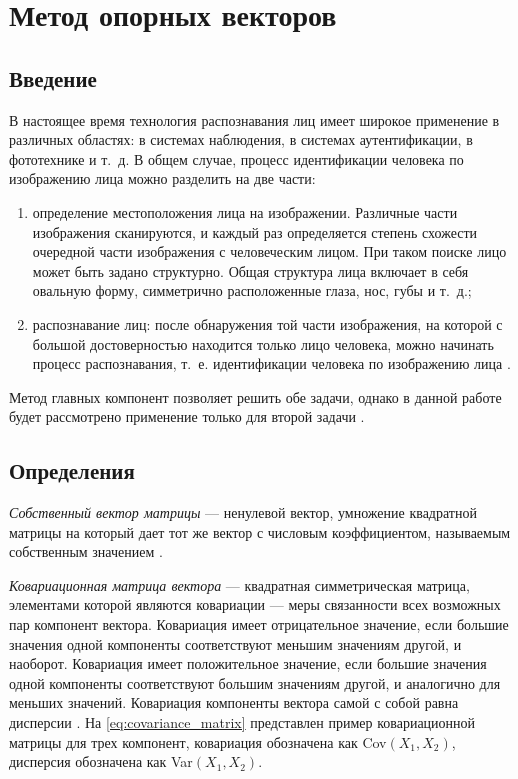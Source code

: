 \chapter{Метод опорных векторов}
\section{Введение}

В настоящее время технология распознавания лиц имеет широкое применение в различных областях: в системах наблюдения, в системах аутентификации, в фототехнике и т.~д. В общем случае, процесс идентификации человека по изображению лица можно разделить на две части:
\begin{enumerate}
	\item определение местоположения лица на изображении. Различные части изображения сканируются, и каждый раз определяется степень схожести очередной части изображения с человеческим лицом.  При таком поиске лицо может быть задано структурно. Общая структура лица включает в себя овальную форму, симметрично расположенные глаза, нос, губы и т.~д.;
	\item распознавание лиц: после обнаружения той части изображения, на которой с большой достоверностью находится только лицо человека, можно начинать процесс распознавания, т.~е. идентификации человека по изображению лица \cite{ieee}.
\end{enumerate}

Метод главных компонент позволяет решить обе задачи, однако в данной работе  будет рассмотрено применение только для второй задачи \cite{brilyuk}.

\section{Определения}

\textit{Собственный вектор матрицы} --- ненулевой вектор, умножение квадратной матрицы на который дает тот же вектор с числовым коэффициентом, называемым собственным значением \cite{linal}.

\textit{Ковариационная матрица вектора} --- квадратная симметрическая матрица, элементами которой являются ковариации --- меры связанности всех возможных пар компонент вектора. Ковариация имеет отрицательное значение, если большие значения одной компоненты соответствуют меньшим значениям другой, и наоборот. Ковариация имеет положительное значение, если большие значения одной компоненты соответствуют большим значениям другой, и аналогично для меньших значений. Ковариация компоненты вектора самой с собой равна дисперсии \cite{teorver}. На \eqref{eq:covariance_matrix} представлен пример ковариационной матрицы для трех компонент, ковариация обозначена как Cov$(X_1, X_2)$, дисперсия обозначена как Var$(X_1, X_2)$.

